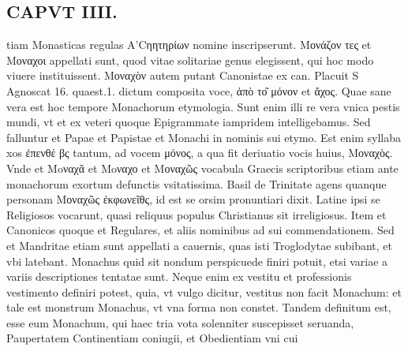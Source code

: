 \documentclass{article}
\begin{document}
\begin{pages}
\section*{CAPVT  IIII. }
\marginpar{[ p.213 ]}\pstart tiam Monasticas regulas A'Cηητηρίων nomine inscripserunt. Μονάζον τες et Μοναχοι appellati sunt, quod vitae solitariae genus elegissent, qui hoc modo viuere instituissent. Μοναχὸν autem putant Canonistae ex can. Placuit S Agnoscat 16. quaest.1. dictum composita voce, ἀπὸ το͂ μόνον et ἄχος. Quae sane vera est hoc tempore Monachorum etymologia. Sunt enim illi re vera vnica pestis mundi, vt et ex veteri quoque Epigrammate iampridem intelligebamus. Sed falluntur et Papae et Papistae et Monachi in nominis sui etymo. Est enim syllaba xos ἐπενθέ βς tantum, ad vocem μόνος, a qua fit deriuatio vocis huius, Μοναχὸς. Vnde et Moναχᾶ et Moναχο et Μοναχῶς vocabula Graecis scriptoribus etiam ante monachorum exortum defunctis vsitatissima. Basil de Trinitate agens quanque personam Μοναχῶς ἐκφωνεῖθς, id est se orsim pronuntiari dixit. Latine ipsi se Religiosos vocarunt, quasi reliquus populus Christianus sit irreligiosus. Item et Canonicos quoque et Regulares, et aliis nominibus ad sui commendationem. Sed et Mandritae etiam sunt appellati a cauernis, quas isti Troglodytae subibant, et vbi latebant. Monachus quid sit nondum perspicuede finiri potuit, etsi variae a variis descriptiones tentatae sunt. Neque enim ex vestitu et professionis vestimento definiri potest, quia, vt vulgo dicitur, vestitus non facit Monachum: et tale est monstrum Monachus, vt vna forma non constet. Tandem definitum est, esse eum Monachum, qui haec tria vota solenniter suscepisset seruanda, Paupertatem Continentiam coniugii, et Obedientiam vni cui  \pend

\end{pages}
\end{document}

